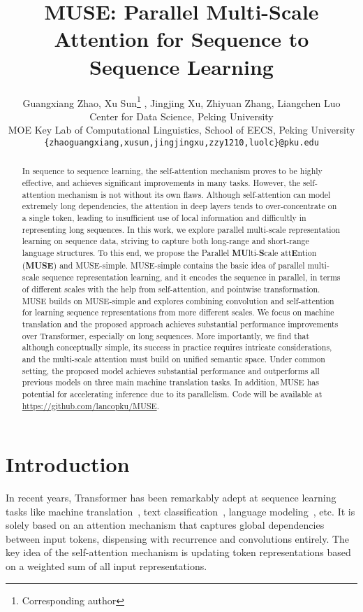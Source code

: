\documentclass{article} \usepackage{iclr2020_conference,times}
\title{MUSE: Parallel Multi-Scale Attention for Sequence to Sequence Learning}
\author{Guangxiang Zhao\ssymbol{2}, Xu Sun\ssymbol{2}\ssymbol{3}\thanks{ Corresponding author} , Jingjing Xu\ssymbol{3}, Zhiyuan Zhang\ssymbol{3}, Liangchen Luo\ssymbol{3} \\
\ssymbol{2}Center for Data Science, Peking University\\
\ssymbol{3}MOE Key Lab of Computational Linguistics, School of EECS, Peking University\\
\texttt{\{zhaoguangxiang,xusun,jingjingxu,zzy1210,luolc\}@pku.edu} \\
}
\begin{document}
\maketitle



\begin{abstract}


In sequence to sequence learning, the self-attention mechanism proves to be highly effective, and achieves significant improvements in many tasks. However, the self-attention mechanism is not without its own flaws. Although self-attention can model extremely long dependencies, the attention in deep layers tends to over-concentrate on a single token, leading to insufficient use of local information and difficultly in representing long sequences. In this work, we explore parallel multi-scale representation learning on sequence data, striving to capture both long-range and short-range language structures. To this end, we propose the Parallel \textbf{ MU}lti-\textbf{S}cale att\textbf{E}ntion (\textbf{MUSE}) and MUSE-simple. MUSE-simple contains the basic idea of parallel multi-scale sequence representation learning, and it encodes the sequence in parallel, in terms of different scales with the help from self-attention,  and pointwise transformation. MUSE builds on MUSE-simple and explores  combining convolution and self-attention for learning sequence representations from more different scales.
We focus on machine translation and the proposed approach achieves substantial performance improvements over Transformer, especially on long sequences. More importantly, we find that although conceptually simple, its success in practice requires intricate considerations, and the multi-scale attention must build on unified semantic space. Under common setting, the proposed model achieves substantial performance and outperforms all previous models on three main machine translation tasks. In addition, MUSE has potential for accelerating inference due to its parallelism.
Code will be available at \url{https://github.com/lancopku/MUSE}.









\end{abstract}
\section{Introduction}
In recent years, Transformer has been remarkably adept at sequence learning tasks like machine translation~\citep{vaswani2017attention,dehghani2018universal}, 
text classification~\citep{devlin2018bert,yang2019xlnet}, language modeling~\citep{sukhbaatar2019augmenting,Dai_2019}, etc. It is solely based on an attention mechanism that captures global dependencies between input tokens, dispensing with recurrence and convolutions entirely. The key idea of the self-attention mechanism is updating token representations based on a weighted sum of all input representations.  
\end{document}
